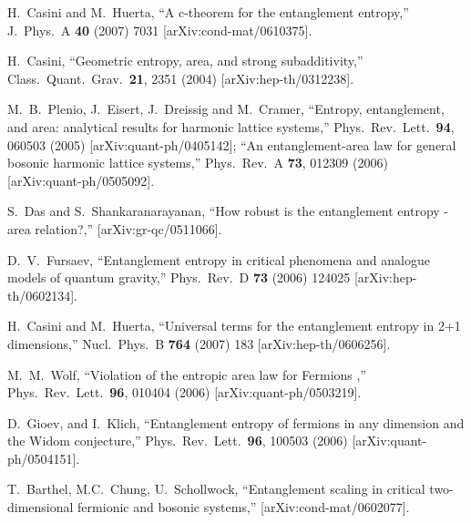 \documentclass[12pt]{article}
\begin{document}
\begin{thebibliography}{99}
  H.~Casini and M.~Huerta,
  ``A c-theorem for the entanglement entropy,''
  J.\ Phys.\ A  {\bf 40} (2007) 7031
  [arXiv:cond-mat/0610375].




  H.~Casini,
  ``Geometric entropy, area, and strong subadditivity,''
  Class.\ Quant.\ Grav.\  {\bf 21}, 2351 (2004)
  [arXiv:hep-th/0312238].



 M.~B.~Plenio, J.~Eisert, J.~Dreissig and M.~Cramer,
  ``Entropy, entanglement, and area: analytical results for harmonic lattice
  systems,''
  Phys.\ Rev.\ Lett.\  {\bf 94}, 060503 (2005)
  [arXiv:quant-ph/0405142];
  ``An entanglement-area law for general bosonic harmonic lattice systems,''
  Phys.\ Rev.\ A {\bf 73}, 012309 (2006)
  [arXiv:quant-ph/0505092].

  S.~Das and S.~Shankaranarayanan,
  ``How robust is the entanglement entropy - area relation?,''
  [arXiv:gr-qc/0511066].

  D.~V.~Fursaev,
  ``Entanglement entropy in critical phenomena and analogue models of quantum
  gravity,''
  Phys.\ Rev.\  D {\bf 73} (2006) 124025
  [arXiv:hep-th/0602134].



  H.~Casini and M.~Huerta,
  ``Universal terms for the entanglement entropy in 2+1 dimensions,''
  Nucl.\ Phys.\  B {\bf 764} (2007) 183
  [arXiv:hep-th/0606256].





M.\ M.\ Wolf,
``Violation of the entropic area law for Fermions ,''
Phys.\ Rev.\ Lett.\  {\bf 96}, 010404 (2006)
[arXiv:quant-ph/0503219].

D.\ Gioev, and I.\ Klich,
``Entanglement entropy of fermions in any
dimension and the Widom conjecture,''
Phys.\ Rev.\ Lett.\  {\bf 96},
100503 (2006) [arXiv:quant-ph/0504151].



T.\ Barthel, M.\-C.\ Chung, U.\ Schollwock,
``Entanglement scaling
in critical two-dimensional fermionic and bosonic systems,''
[arXiv:cond-mat/0602077].


\end{thebibliography}
\end{document}
